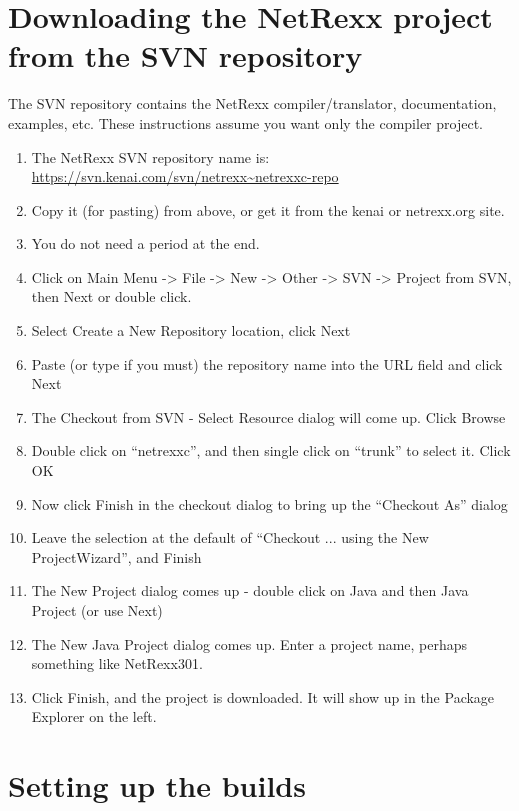 \section{Downloading the NetRexx project from the SVN repository}
 
The SVN repository contains the NetRexx compiler/translator,
documentation, examples, etc.  These instructions assume you want only
the compiler project.
\begin{enumerate}
\item The NetRexx SVN repository name is:
            \url{https://svn.kenai.com/svn/netrexx~netrexxc-repo}
\item Copy it (for pasting) from above, or get it from the kenai or
            netrexx.org site.
\item You do not need a period at the end.
\item Click on Main Menu -> File -> New -> Other -> SVN -> Project from
            SVN, then Next or double click.
\item Select Create a New Repository location, click Next
\item Paste (or type if you must) the repository name into the URL field
            and click Next
\item The Checkout from SVN - Select Resource dialog will come up.  Click
            Browse
\item Double click on ``netrexxc'', and then single click on ``trunk'' to
            select it.  Click OK
\item Now click Finish in the checkout dialog to bring up the ``Checkout
            As'' dialog
\item Leave the selection at the default of ``Checkout ... using the New
            ProjectWizard'', and Finish
\item The New Project dialog comes up - double click on Java and then
            Java Project (or use Next)
\item The New Java Project dialog comes up.  Enter a project name,
            perhaps something like NetRexx301.
\item Click Finish, and the project is downloaded.  It will show up in
            the Package Explorer on the left.
\end{enumerate}
\section{Setting up the builds}
 
